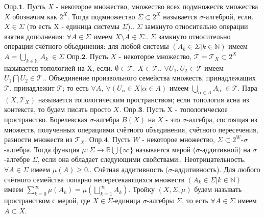 \documentclass[a4paper,14pt]{article}
\begin{document}
$\textbf{Опр.1.}$ Пусть $X$ - некоторое множество, множество всех подмножеств множества $X$ обозначим как $2^X$. Тогда подмножество $\Sigma\subset 2^X$ называется $\sigma$-алгеброй, если. $X\in\Sigma$ (то есть X - единица системы $\Sigma$).. $\Sigma$ замкнуто относительно операции взятия дополнения: $\forall A\in\Sigma$ имеем $X\setminus A\in\Sigma$.. $\Sigma$ замкнуто относительно операции счётного объединения: для любой системы $(A_k\in\Sigma|k\in\mathbb{N})$ имеем $A=\bigcup\limits_{k\in\mathbb{N}} A_k\ \in\Sigma$\newline
$\textbf{Опр.2.}$ Пусть $X$ - некоторое множество, $\mathcal{T}=\mathcal{T}_X\subset 2^X$ называется топологией на X, если. $\emptyset\in\mathcal{T},\ X\in\mathcal{T}$.. $\forall U_1,U_2\in\mathcal{T}$ имеем $U_1\bigcap U_2\in\mathcal{T}$.. Объединение произвольного семейства множеств, принадлежащих $\mathcal{T}$, принадлежит $\mathcal {T}$; то есть $\forall A,\ \forall(U_{\alpha}\in X|\alpha\in A)$ имеем $\bigcup\limits_{\alpha\in A} A_{\alpha}\ \in\mathcal{T}$.\newline
Пара $(X,\mathcal{T}_X)$ называется топологическим пространством; если топология ясна из контекста, то будем писать просто $X$.\newline
$\textbf{Опр.3.}$ Пусть X - топологическое пространство. Борелевская $\sigma$-алгебра $B(X)$ на $X$ - это $\sigma$-алгебра, состоящая из множеств, полученных операциями счётного объединения, счётного пересечения, разности множеств из $\mathcal{T}_X$.\newline
$\textbf{Опр.4.}$ Пусть $W$ - некоторое множество, $\Sigma\subset 2^W$-$\sigma$-алгебра. Тогда функция $\mu:\Sigma\rightarrow\mathbb{R}\bigcup\{\infty\}$ называется мерой ($\sigma$-аддитивной) на $\sigma$-алгебре $\Sigma$, если она обладает следующими свойствами:. Неотрицательность. $\forall A\in\Sigma$ имеем $\mu(A)\geq 0$.. Счётная аддитивность ($\sigma$-аддитивность). Для любого счётного семейства попарно непересекающихся множеств $(A_k\in\Sigma|k\in\mathbb{N})$ имеем $\sum\limits_{k=0}^{\infty}\mu(A_k)=\mu(\bigsqcup\limits_{k=1}^{\infty} A_k)$.\newline
Тройку $(X,\Sigma,\mu)$ будем называть пространством с мерой, где $X\in\Sigma$-единица $\sigma$-алгебры $\Sigma$, то есть $\forall A\in\Sigma$ имеем $A\subset X$.\newline
\end{document}
